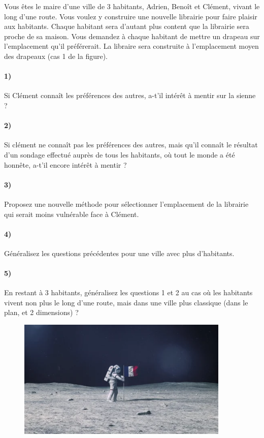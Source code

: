 \documentclass[a4paper,10pt,oneside]{article}
\begin{document}
Vous êtes le maire d'une ville de 3 habitants, Adrien, Benoît et Clément,  vivant le long d'une route.
Vous voulez y construire une nouvelle librairie pour faire plaisir aux habitants.
Chaque habitant sera d'autant plus content que la librairie sera proche de sa maison. 
Vous demandez à chaque habitant de mettre un drapeau sur l'emplacement qu'il préférerait.
La libraire sera construite à l'emplacement moyen des drapeaux (cas 1 de la figure).

\paragraph*{1)} 
Si Clément connaît les préférences des autres, a-t'il intérêt à mentir sur la sienne ?

\paragraph*{2)} 
Si clément ne connaît pas les préférences des autres, mais qu'il connaît le résultat d'un sondage effectué auprès de tous les habitants, où tout le monde a été honnête, a-t'il encore intérêt à mentir ?

\paragraph*{3)} 
Proposez une nouvelle méthode pour sélectionner l'emplacement de la librairie qui serait moins vulnérable face à Clément.

\paragraph*{4)} 
Généralisez les questions précédentes pour une ville avec plus d'habitants.

\paragraph*{5)} 
En restant à 3 habitants, généralisez les questions 1 et 2 au cas où les habitants vivent non plus le long d'une route, mais dans une ville plus classique (dans le plan, et 2 dimensions) ? 


\vspace{3cm}
\begin{figure}[!ht]
  \centering
  \includegraphics[width=0.9\textwidth]{figures/flag.png}
\end{figure}
\end{document}
